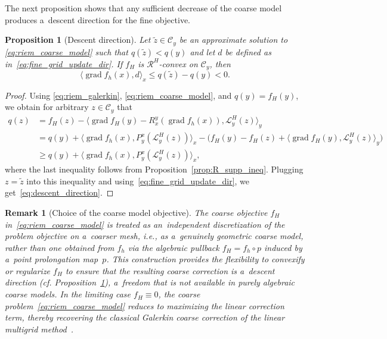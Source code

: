 \documentclass[11pt,reqno]{amsart}
\theoremstyle{plain}
\newtheorem{prop}[thm]{Proposition}
\newtheorem{rem}[thm]{Remark}
\DeclareMathOperator{\grad}{grad}
\newcommand\calC{\mathcal C}
\newcommand{\Ret}{\mathcal R}
\newcommand{\invRet}{\mathcal L}
\begin{document}
	The next proposition shows that any sufficient decrease of the coarse
	model produces a~descent direction for the fine objective.
	
	\begin{prop}[Descent direction]\label{prop:descent_dir} 
		Let $\tilde{z}\in\calC_y$ be an approximate solution to \eqref{eq:riem_coarse_model} such that $q(\tilde{z})<q(y)$ and let $d$ be defined as in~\eqref{eq:fine_grid_update_dir}. If $f_H$ is $\Ret^H$-convex on $\calC_y$, then 
		\begin{equation} \label{eq:descent_direction}
			\langle \grad f_h(x), d\rangle_{x} \le q(\tilde{z}) - q(y) < 0.
		\end{equation}
	\end{prop}
	\begin{proof}
		Using \eqref{eq:riem_galerkin}, \eqref{eq:riem_coarse_model}, and $q(y) = f_H(y)$, we obtain for arbitrary $z \in \calC_y$ that
		\begin{align*}
			q(z) 
			&= f_H(z) - \big\langle \grad f_H(y) - R_{x}^{y}(\grad f_h(x)), \invRet_{y}^H(z)\big\rangle_{y} \\
			&
			= q(y) + \big\langle \grad f_h(x) , P_{y}^{x}(\invRet_{y}^H(z))\big\rangle_{x} - \big(f_H(y) - f_H(z) + \langle  \grad f_H(y), \invRet_{y}^H(z)\rangle_{y}\big)\\
			&\ge q(y) + \big\langle \grad f_h(x) , P_{y}^{x}(\invRet_{y}^H(z))\big\rangle_{x},
		\end{align*}
		where the last inequality follows from Proposition~\ref{prop:R_supp_ineq}. Plugging  $z=\tilde{z}$ into this inequality and using~\eqref{eq:fine_grid_update_dir}, we get~\eqref{eq:descent_direction}.
	\end{proof}
	
	\begin{rem}[Choice of the coarse model objective]\label{rem:coarse_choice}
		The coarse objective $f_H$ in~\eqref{eq:riem_coarse_model} is treated as an~independent discretization of the problem objective on a~coarser mesh, i.e., as a~genuinely \emph{geometric} coarse model, rather than one obtained from $f_h$ via the algebraic pullback $f_H = f_h \circ p$ induced by a~point prolongation map~$p$. This construction provides the flexibility to convexify or regularize $f_H$ to ensure that the resulting coarse correction is a~descent direction {\rm(}cf. Proposition~\textup{\ref{prop:descent_dir}}{\rm)}, a~freedom that is not available in purely algebraic coarse models. In the limiting case $f_H \equiv 0$, the coarse problem~\eqref{eq:riem_coarse_model} reduces to maximizing the linear correction term, thereby recovering the classical Galerkin coarse correction of the linear multigrid method~\textup{\cite{Nash:2000,Trottenberg2001}}.
	\end{rem}
	
\end{document}
